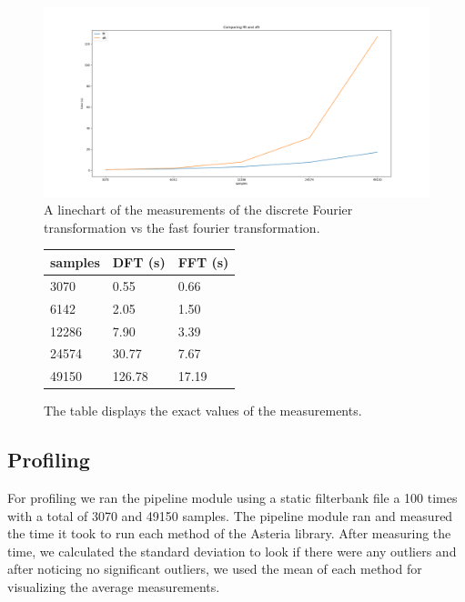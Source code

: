 \documentclass[a4paper,11pt]{report}
\begin{document}
    \begin{figure}[h!]
        \hspace*{-2cm}                                                           
        \includegraphics[width=1.4\columnwidth]{linechart_dft_vs_fft}
        \caption{A linechart of the measurements of the discrete Fourier transformation vs the fast fourier transformation.}
    \end{figure}

    \begin{figure}[h!]
        \centering
        \begin{tabular}{|l|l|l|}
            \hline
            samples & DFT (s) & FFT (s) \\ \hline
            3070    & 0.55    & 0.66    \\ \hline
            6142    & 2.05    & 1.50    \\ \hline
            12286   & 7.90    & 3.39    \\ \hline
            24574   & 30.77   & 7.67    \\ \hline
            49150   & 126.78  & 17.19   \\ \hline
        \end{tabular}
        \caption{The table displays the exact values of the measurements.}
    \end{figure}

    \subsection{Profiling}

    For profiling we ran the pipeline module using a static filterbank file a 100 times with a total of 3070 and 49150 samples. The pipeline module ran and measured the time it took
    to run each method of the Asteria library. After measuring the time, we calculated the standard deviation to look if there were any outliers and after noticing no significant
    outliers, we used the mean of each method for visualizing the average measurements.
\end{document}
